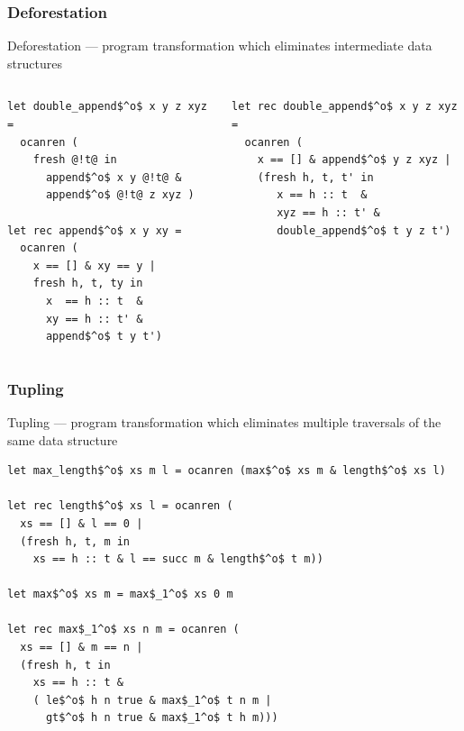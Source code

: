 \documentclass[xcolor=table]{beamer}
\begin{document}
\begin{frame}[fragile]
  \transwipe[direction=90]
  \frametitle{Deforestation}
Deforestation --- program transformation which eliminates intermediate data structures

\begin{columns}
\begin{column}{0.45\textwidth}
\begin{lstlisting}[basicstyle=\footnotesize]
let double_append$^o$ x y z xyz = 
  ocanren (
    fresh @!t@ in
      append$^o$ x y @!t@ &
      append$^o$ @!t@ z xyz )

let rec append$^o$ x y xy = 
  ocanren (
    x == [] & xy == y |
    fresh h, t, ty in
      x  == h :: t  &
      xy == h :: t' &
      append$^o$ t y t')
\end{lstlisting}
\end{column}
\begin{column}{0.55\textwidth}
\begin{lstlisting}[basicstyle=\footnotesize]
let rec double_append$^o$ x y z xyz = 
  ocanren (
    x == [] & append$^o$ y z xyz |
    (fresh h, t, t' in
       x == h :: t  &
       xyz == h :: t' &
       double_append$^o$ t y z t')
\end{lstlisting}
\end{column}
\end{columns}
\end{frame}

\begin{frame}[fragile]
  \transwipe[direction=90]
  \frametitle{Tupling}
Tupling --- program transformation which eliminates multiple traversals of the same data structure

\begin{lstlisting}[basicstyle=\footnotesize]
let max_length$^o$ xs m l = ocanren (max$^o$ xs m & length$^o$ xs l)

let rec length$^o$ xs l = ocanren (
  xs == [] & l == 0 |
  (fresh h, t, m in
    xs == h :: t & l == succ m & length$^o$ t m))

let max$^o$ xs m = max$_1^o$ xs 0 m

let rec max$_1^o$ xs n m = ocanren (
  xs == [] & m == n |
  (fresh h, t in
    xs == h :: t &
    ( le$^o$ h n true & max$_1^o$ t n m |
      gt$^o$ h n true & max$_1^o$ t h m)))
\end{lstlisting}

\end{frame}
\end{document}
